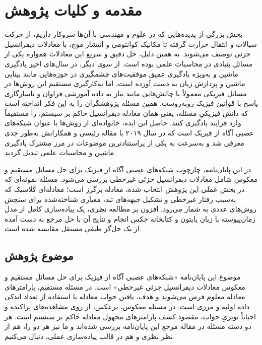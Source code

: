 \chapter{مقدمه و کلیات پژوهش}
\label{ch:intro}

بخش بزرگی از پدیده‌هایی که در علوم و مهندسی با آن‌ها سروکار داریم، از حرکت
سیالات و انتقال حرارت گرفته تا مکانیک کوانتومی و انتشار موج، با معادلات
دیفرانسیل جزئی توصیف می‌شوند.
به همین دلیل، حل دقیق و سریع این معادلات همواره یکی از مسائل بنیادی در
محاسبات علمی بوده است. از سوی دیگر، در سال‌های اخیر یادگیری ماشین و به‌ویژه
یادگیری عمیق موفقیت‌های چشمگیری در حوزه‌هایی مانند
بینایی ماشین و پردازش زبان به دست آورده است، اما به‌کارگیری مستقیم این
روش‌ها در مسائل فیزیکی معمولاً با چالش‌هایی مانند نیاز به داده آموزشی فراوان
و ناسازگاری پاسخ با قوانین فیزیک روبه‌روست. همین مسئله پژوهشگران را به این
فکر انداخته است که دانش فیزیکیِ مسئله، یعنی همان معادله دیفرانسیل حاکم بر
سیستم، را مستقیماً وارد فرایند یادگیری کنند. حاصل این ایده، خانواده‌ای از
روش‌ها با عنوان شبکه‌های عصبی آگاه از فیزیک است که در
سال ۲۰۱۹ با مقاله رئیسی و همکارانش به‌طور جدی معرفی شد \cite{raissi2019} و
به‌سرعت به یکی از پراستنادترین موضوعات در مرز مشترک یادگیری ماشین و محاسبات
علمی تبدیل گردید.

در این پایان‌نامه، چارچوب شبکه‌های عصبی آگاه از فیزیک برای حل مسائل مستقیم و
معکوس شامل معادلات دیفرانسیل جزئی غیرخطی بررسی می‌شود. مسئله نمونه‌ای که در
بخش عملی این پژوهش انتخاب شده، معادله برگرز است؛
معادله‌ای کلاسیک که به‌سبب رفتار غیرخطی و تشکیل جبهه‌های تند، معیاری شناخته‌شده
برای سنجش روش‌های عددی به شمار می‌رود. افزون بر مطالعه نظری، یک پیاده‌سازی
کامل از مدل زمان‌پیوسته با زبان پایتون و کتابخانه جکس انجام و
نتایج آن با حل مرجع به دست آمده از یک حل‌گر طیفی مستقل مقایسه شده است.

\section{موضوع پژوهش}
\label{sec:subject}

موضوع این پایان‌نامه «شبکه‌های عصبی آگاه از فیزیک برای حل مسائل مستقیم و
معکوس معادلات دیفرانسیل جزئی غیرخطی» است. در مسئله مستقیم،
پارامترهای معادله معلوم فرض می‌شوند و هدف، یافتن جواب معادله با استفاده از
تعداد اندکی داده اولیه و مرزی است. در مسئله معکوس،
برعکس، از روی مشاهده‌های پراکنده و احیاناً نویزیِ جواب، مقصود کشف پارامترهای
مجهول معادله حاکم بر سیستم است. هر دو دسته مسئله در مقاله مرجع این
پایان‌نامه \cite{raissi2019} بررسی شده‌اند و ما نیز هر دو را، هم از نظر نظری
و هم در قالب پیاده‌سازی عملی، دنبال می‌کنیم.

